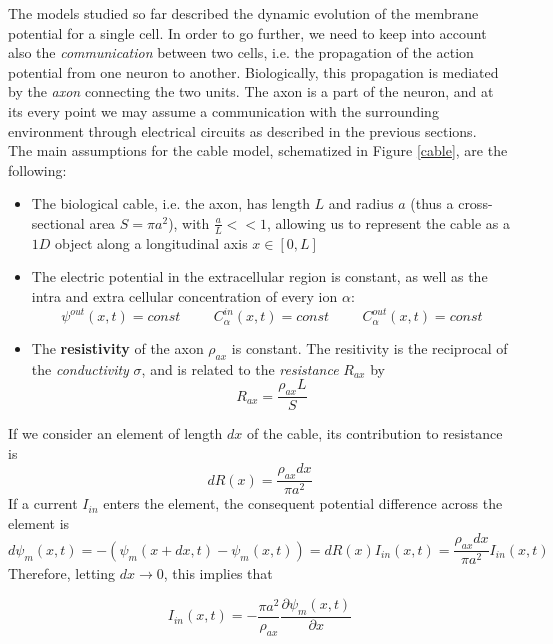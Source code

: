 \documentclass[12pt, a4paper]{report}
\begin{document}
The models studied so far described the dynamic evolution of the membrane potential  for a single cell. In order to go further, we need to keep into account also the \textit{communication} between two cells, i.e. the propagation of the action potential from one neuron to another. Biologically, this propagation is mediated by the \textit{axon} connecting the two units. The axon is a part of the neuron, and at its every point we may assume a communication with the surrounding environment through electrical circuits as described in the previous sections.\\
The main assumptions for the cable model, schematized in Figure \ref{cable}, are the following:

\begin{itemize}
	
	\item The biological cable, i.e. the axon, has length $L$ and radius $a$ (thus a cross-sectional area  $S=\pi a^2$), with $\frac{a}{L} << 1$, allowing us to represent the cable as a $1D$ object along a longitudinal axis $ x \in [0,L]$
	
	\item The electric potential in the extracellular region is constant, as well as the intra and extra cellular concentration of every ion $\alpha$: 
	$$ \psi^{out}(x,t) = const  \hspace{1cm} C_\alpha^{in}(x,t)  = const \hspace{1cm} C_\alpha^{out}(x,t)  = const$$
	
	\item The \textbf{resistivity} of the axon $\rho_{ax}$ is constant. The resitivity is the reciprocal of the \textit{conductivity} $\sigma$, and is related to the \textit{resistance} $R_{ax}$ by
	 $$ R_{ax} = \frac{\rho_{ax} L}{S} $$
	
	
\end{itemize}


If we consider an element of length $dx$ of the cable, its contribution to resistance is $$dR(x) = \frac{\rho_{ax} dx}{\pi a^2}$$ If a current $I_{in}$ enters the element, the consequent potential difference across the element is 
$$ d\psi_m(x,t) = - \left(\psi_m(x+dx,t) - \psi_m(x,t)\right) = dR(x)I_{in}(x,t) = \frac{\rho_{ax} dx}{\pi a^2} I_{in}(x,t)$$ Therefore, letting $dx \rightarrow 0$, this implies that

\begin{equation}
I_{in}(x,t) = -\frac{\pi a^2}{\rho_{ax}}\frac{\partial \psi_m(x,t)}{\partial x}
\end{equation}
\end{document}
